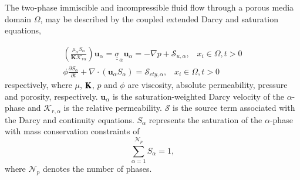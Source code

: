 \documentclass[preprint,authoryear,12pt]{elsarticle}
\begin{document}

\medskip
The two-phase immiscible and incompressible fluid flow through a porous media domain $\Omega$, may be described by the coupled extended Darcy and saturation equations,

\begin{eqnarray}
\left(\displaystyle\frac{\mu_{\alpha}S_{\alpha}}{{\mathbf K}\mathcal{K}_{r\alpha}}\right) {\mathbf u}_{\alpha} = \underline{\underline{\sigma}}_{\alpha} {\mathbf u}_{\alpha} = -\nabla p + \mathcal{S}_{u,\alpha},\;\;\; x_{i}\in\Omega, t>0 \label{eqn:darcy_eqn} \\
\phi\displaystyle\frac{\partial S_{\alpha} }{\partial t} +   \nabla \cdot \left( {\mathbf u}_{\alpha}  S_{\alpha}\right) =  \mathcal{S}_{cty,\alpha},\;\;\; x_{i}\in\Omega, t>0\label{eqn:saturation_eqn}
\end{eqnarray} 
respectively, where $\mu$, ${\bf K}$, $p$ and $\phi$ are viscosity, absolute permeability, pressure and porosity, respectively. ${\mathbf u}_{\alpha}$ is the saturation-weighted Darcy velocity of the $\alpha$-phase and $\mathcal{K}_{r,\alpha}$ is the relative permeability. $\mathcal{S}$ is the source term associated with the Darcy and continuity equations. $S_{\alpha}$ represents the saturation of the $\alpha$-phase with mass conservation constraints of 
\begin{displaymath}
\sum\limits_{\alpha=1}^{\mathcal{N}_{p}} S_{\alpha} = 1, 
\end{displaymath}
where $\mathcal{N}_{p}$ denotes the number of phases.

\end{document}
